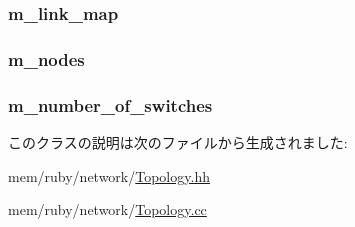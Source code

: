 \label{classTopology_a96f6560390d8d9fb6326abbaae50fc20}
\hypertarget{classTopology_acffefd560ca1c4dd1092c89a15ec0d19}{
\subsubsection[{m\_\-link\_\-map}]{ {\bf m\_\-link\_\-map}}}
\label{classTopology_acffefd560ca1c4dd1092c89a15ec0d19}
\hypertarget{classTopology_a7848ab01a6ad135426df6bb144453914}{
\subsubsection[{m\_\-nodes}]{ {\bf m\_\-nodes}}}
\label{classTopology_a7848ab01a6ad135426df6bb144453914}
\hypertarget{classTopology_a2eba391273b82b4c4ed877d2afc3a32e}{
\subsubsection[{m\_\-number\_\-of\_\-switches}]{ {\bf m\_\-number\_\-of\_\-switches}}}
\label{classTopology_a2eba391273b82b4c4ed877d2afc3a32e}


このクラスの説明は次のファイルから生成されました:\begin{DoxyCompactItemize}
\item 
mem/ruby/network/\hyperlink{Topology_8hh}{Topology.hh}\item 
mem/ruby/network/\hyperlink{Topology_8cc}{Topology.cc}\end{DoxyCompactItemize}

